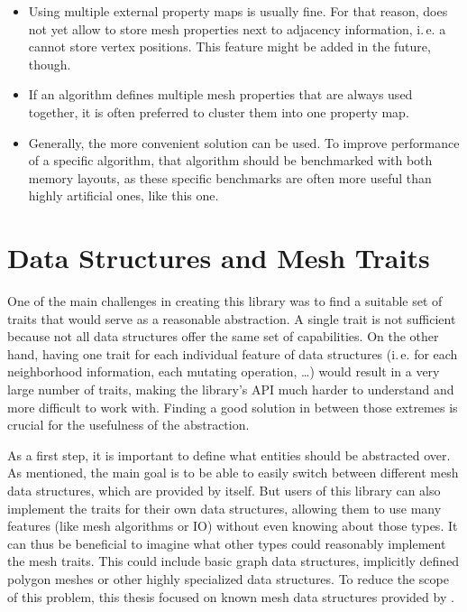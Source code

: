 \begin{itemize}
  \item Using multiple external property maps is usually fine.
  For that reason,  does not yet allow to store mesh properties next to adjacency information, i.\,e. a  cannot store vertex positions.
  This feature might be added in the future, though.
  \item If an algorithm defines multiple mesh properties that are always used together, it is often preferred to cluster them into one property map.
  \item Generally, the more convenient solution can be used.
  To improve performance of a specific algorithm, that algorithm should be benchmarked with both memory layouts, as these specific benchmarks are often more useful than highly artificial ones, like this one.
\end{itemize}



\newpage
\section{Data Structures and Mesh Traits}

One of the main challenges in creating this library was to find a suitable set of traits that would serve as a reasonable abstraction.
A single trait is not sufficient because not all data structures offer the same set of capabilities.
On the other hand, having one trait for each individual feature of data structures (i.\,e. for each neighborhood information, each mutating operation, \dots) would result in a very large number of traits, making the library's API much harder to understand and more difficult to work with.
Finding a good solution in between those extremes is crucial for the usefulness of the abstraction.

As a first step, it is important to define what entities should be abstracted over.
As mentioned, the main goal is to be able to easily switch between different mesh data structures, which are provided by  itself.
But users of this library can also implement the traits for their own data structures, allowing them to use many features (like mesh algorithms or IO) without  even knowing about those types.
It can thus be beneficial to imagine what other types could reasonably implement the mesh traits.
This could include basic graph data structures, implicitly defined polygon meshes or other highly specialized data structures.
To reduce the scope of this problem, this thesis focused on known mesh data structures provided by .

